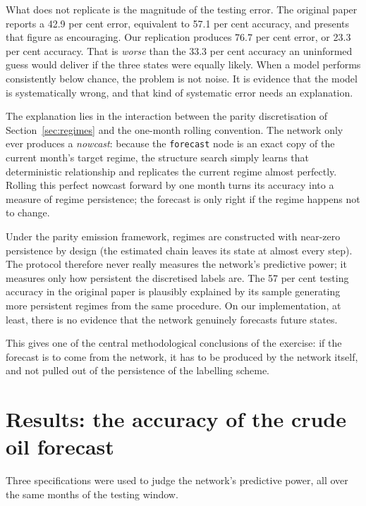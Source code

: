 \documentclass[11pt,a4paper]{article}
\begin{document}
What does not replicate is the magnitude of the testing error. The original paper reports a
42.9 per cent error, equivalent to 57.1 per cent accuracy, and presents that figure as
encouraging. Our replication produces 76.7 per cent error, or 23.3 per cent accuracy. That is
\textit{worse} than the 33.3 per cent accuracy an uninformed guess would deliver if the three
states were equally likely. When a model performs consistently below chance, the problem is not
noise. It is evidence that the model is systematically wrong, and that kind of systematic error
needs an explanation.

The explanation lies in the interaction between the parity discretisation of
Section~\ref{sec:regimes} and the one-month rolling convention. The network only ever produces a
\textit{nowcast}: because the \texttt{forecast} node is an exact copy of the current month's
target regime, the structure search simply learns that deterministic relationship and replicates
the current regime almost perfectly. Rolling this perfect nowcast forward by one month turns its
accuracy into a measure of regime persistence; the forecast is only right if the regime happens
not to change.

Under the parity emission framework, regimes are constructed with near-zero persistence by design
(the estimated chain leaves its state at almost every step). The protocol therefore never really
measures the network's predictive power; it measures only how persistent the discretised labels
are. The 57 per cent testing accuracy in the original paper is plausibly explained by its sample
generating more persistent regimes from the same procedure. On our implementation, at least,
there is no evidence that the network genuinely forecasts future states.

This gives one of the central methodological conclusions of the exercise: if the forecast is to
come from the network, it has to be produced by the network itself, and not pulled out of the
persistence of the labelling scheme.

\section{Results: the accuracy of the crude oil forecast}
\label{sec:results}

Three specifications were used to judge the network's predictive power, all over the same months
of the testing window.
\end{document}
